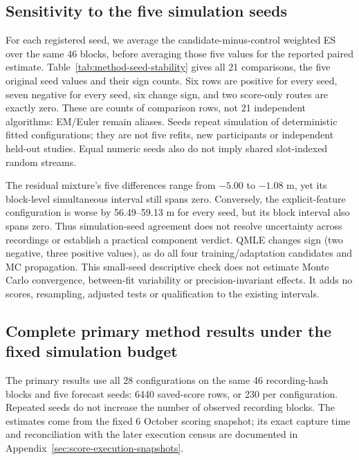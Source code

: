 \documentclass[11pt]{article}
\begin{document}
\subsection{Sensitivity to the five simulation seeds}
\label{sec:method-seed-stability}
For each registered seed, we average the candidate-minus-control weighted
ES over the same 46 blocks, before averaging those five values for the
reported paired estimate. Table~\ref{tab:method-seed-stability} gives all
21 comparisons, the five original seed values and their sign counts.
Six rows are positive for every seed, seven negative for every seed,
six change sign, and two score-only routes are exactly zero. These are
counts of comparison rows, not 21 independent algorithms: EM/Euler remain
aliases. Seeds repeat simulation of deterministic fitted configurations;
they are not five refits, new participants or independent held-out studies.
Equal numeric seeds also do not imply shared slot-indexed random streams.

The residual mixture's five differences range from $-5.00$ to $-1.08$ m,
yet its block-level simultaneous interval still spans zero. Conversely,
the explicit-feature configuration is worse by 56.49--59.13 m for every
seed, but its block interval also spans zero. Thus simulation-seed agreement
does not resolve uncertainty across recordings or establish a practical
component verdict. QMLE changes sign (two negative, three positive values),
as do all four training/adaptation candidates and MC propagation.
This small-seed descriptive check does not estimate Monte Carlo convergence,
between-fit variability or precision-invariant effects. It adds no scores,
resampling, adjusted tests or qualification to the existing intervals.

\subsection{Complete primary method results under the fixed simulation budget}
\label{sec:preliminary-methods}
The primary results use all 28 configurations on the same 46 recording-hash
blocks and five forecast seeds: 6440 saved-score rows, or 230 per
configuration. Repeated seeds do not increase the number of observed
recording blocks. The estimates come from the fixed 6 October scoring
snapshot; its exact capture time and reconciliation with the later execution
census are documented in Appendix~\ref{sec:score-execution-snapshots}.
\end{document}
